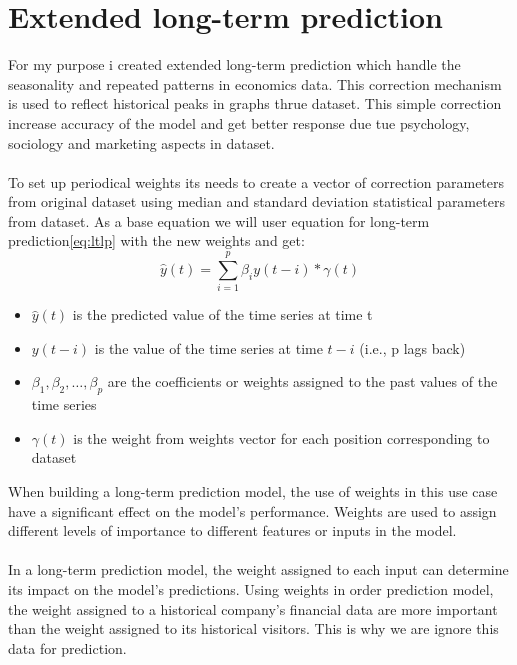     \section{Extended long-term prediction} \label{sec:extlonglp}
    For my purpose i created extended long-term prediction which handle the seasonality and repeated patterns
    in economics data. This correction mechanism is used to reflect historical peaks in graphs thrue dataset.
    This simple correction increase accuracy of the model and get better response due tue psychology,
    sociology and marketing aspects in dataset.\\
    \\
    To set up periodical weights its needs to create a vector of correction parameters from original dataset using
    median and standard deviation statistical parameters from dataset. As a base equation we will user equation
    for long-term prediction\ref{eq:ltlp} with the new weights and get:
    \begin{equation} \label{eq:eltlp}
        \hat{y}(t) = \sum_{i=1}^{p} \beta_i y(t-i) * \gamma(t)
    \end{equation}
    \begin{itemize}
        \item $\hat{y}(t)$ is the predicted value of the time series at time t
        \item $y(t-i)$ is the value of the time series at time $t-i$ (i.e., p lags back)
        \item $\beta_1, \beta_2, \dots, \beta_p$ are the coefficients or weights assigned to the past values of the time series
        \item $\gamma(t)$ is the weight from weights vector for each position corresponding to dataset
    \end{itemize}
    When building a long-term prediction model, the use of weights in this use case have a significant effect on
    the model's performance. Weights are used to assign different levels of importance to different
    features or inputs in the model.\\
    \\
    In a long-term prediction model, the weight assigned to each input can determine its impact on the model's predictions.
    Using weights in order prediction model, the weight assigned to a historical company's financial data are more important
    than the weight assigned to its historical visitors. This is why we are ignore this data for prediction.\\
